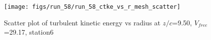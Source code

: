 \begin{figure}[H]
\centering
\texttt{[image: figs/run\_58/run\_58\_ctke\_vs\_r\_mesh\_scatter]}
\caption{Scatter plot of turbulent kinetic energy vs radius at $z/c$=9.50, $V_{free}$=29.17, station6}
\label{fig:run_58_ctke_vs_r_mesh_scatter}
\end{figure}


